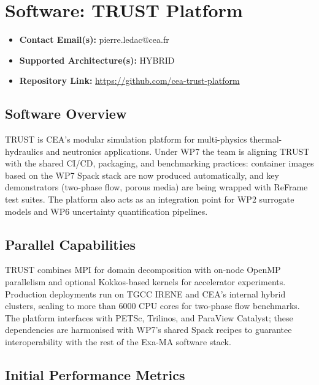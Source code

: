 \section{Software: TRUST Platform}
\label{sec:WP7:TRUST Platform:software}

\begin{itemize}
    \item \textbf{Contact Email(s):} pierre.ledac@cea.fr
    \item \textbf{Supported Architecture(s):} HYBRID
    \item \textbf{Repository Link:} \href{https://github.com/cea-trust-platform}{https://github.com/cea-trust-platform}
\end{itemize}

\subsection{Software Overview}
\label{sec:WP7:TRUST Platform:summary}

TRUST is CEA's modular simulation platform for multi-physics thermal-hydraulics and neutronics applications. Under WP7 the team
is aligning TRUST with the shared CI/CD, packaging, and benchmarking practices: container images based on the WP7 Spack stack
are now produced automatically, and key demonstrators (two-phase flow, porous media) are being wrapped with ReFrame test suites.
The platform also acts as an integration point for WP2 surrogate models and WP6 uncertainty quantification pipelines.

\subsection{Parallel Capabilities}
\label{sec:WP7:TRUST Platform:performances}


TRUST combines MPI for domain decomposition with on-node OpenMP parallelism and optional Kokkos-based kernels for accelerator
experiments. Production deployments run on TGCC IRENE and CEA's internal hybrid clusters, scaling to more than 6000 CPU cores for
two-phase flow benchmarks. The platform interfaces with PETSc, Trilinos, and ParaView Catalyst; these dependencies are
harmonised with WP7's shared Spack recipes to guarantee interoperability with the rest of the Exa-MA software stack.

\subsection{Initial Performance Metrics}
\label{sec:WP7:TRUST Platform:metrics}

